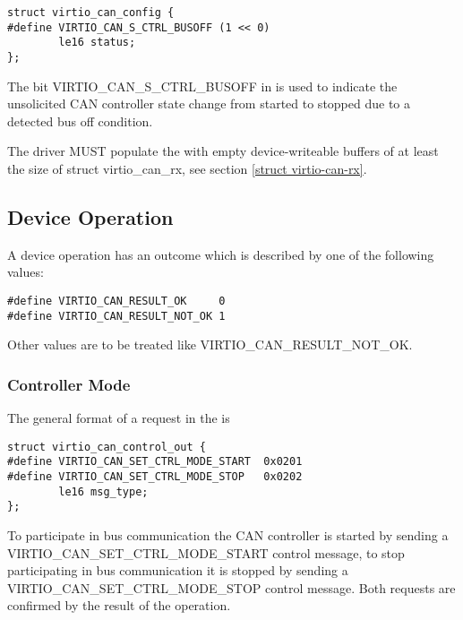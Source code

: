 \begin{lstlisting}
struct virtio_can_config {
#define VIRTIO_CAN_S_CTRL_BUSOFF (1 << 0)
        le16 status;
};
\end{lstlisting}

The bit VIRTIO_CAN_S_CTRL_BUSOFF in  is used to indicate
the unsolicited CAN controller state change from started to stopped due
to a detected bus off condition.


The driver MUST populate the  with empty device-writeable
buffers of at least the size of struct virtio_can_rx, see section
\ref{struct virtio-can-rx}.

\subsection{Device Operation}\label{sec:Device Types / CAN Device / Device Operation}

A device operation has an outcome which is described by one of the
following values:

\begin{lstlisting}
#define VIRTIO_CAN_RESULT_OK     0
#define VIRTIO_CAN_RESULT_NOT_OK 1
\end{lstlisting}

Other values are to be treated like VIRTIO_CAN_RESULT_NOT_OK.

\subsubsection{Controller Mode}\label{sec:Device Types / CAN Device / Device Operation / Controller Mode}

The general format of a request in the  is

\begin{lstlisting}
struct virtio_can_control_out {
#define VIRTIO_CAN_SET_CTRL_MODE_START  0x0201
#define VIRTIO_CAN_SET_CTRL_MODE_STOP   0x0202
        le16 msg_type; 
};
\end{lstlisting}

To participate in bus communication the CAN controller is started by
sending a VIRTIO_CAN_SET_CTRL_MODE_START control message, to stop
participating in bus communication it is stopped by sending a
VIRTIO_CAN_SET_CTRL_MODE_STOP control message. Both requests are
confirmed by the result of the operation.

